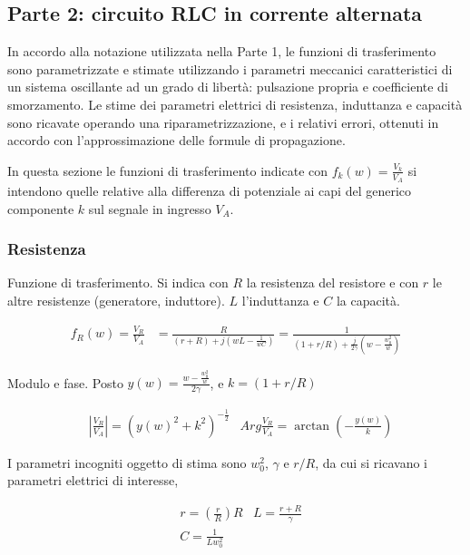 \subsection{Parte 2: circuito RLC in corrente alternata}

In accordo alla notazione utilizzata nella Parte 1, le funzioni di trasferimento sono parametrizzate e stimate utilizzando i parametri meccanici caratteristici di un sistema oscillante ad un grado di libertà: pulsazione propria e coefficiente di smorzamento. Le stime dei parametri elettrici di resistenza, induttanza e capacità sono ricavate operando una riparametrizzazione, e i relativi errori, ottenuti in accordo con l'approssimazione delle formule di propagazione.

In questa sezione le funzioni di trasferimento indicate con 
$f_{k}(w) = \frac{V_k}{V_A}$ si intendono quelle relative alla differenza di potenziale ai capi del generico componente $k$ sul segnale in ingresso $V_A$.





\subsubsection{Resistenza}

Funzione di trasferimento.
Si indica con $R$ la resistenza del resistore e con $r$ le altre resistenze (generatore, induttore).
$L$ l'induttanza e $C$ la capacità.

\begin{align*}
f_{R}(w) = \frac{V_{R}}{V_{A}} &= \frac{R}{(r+R) + j(wL - \frac{1}{wC})} 
= \frac{1}{(1+r/R) + \frac{j}{2\gamma}(w - \frac{w_0^2}{w})}
\end{align*}

Modulo e fase.
Posto $ y(w) = \frac{w - \frac{w_0^2}{w}}{2\gamma} $, e 
$ k = (1+r/R)$

\begin{align*}
& |\frac{V_{R}}{V_{A}}|  = ( y(w)^2 + k^2)^{-\frac{1}{2}}
& Arg\frac{V_{R}}{V_{A}} = \arctan( - \frac{y(w)}{k} )
\end{align*}

I parametri incogniti oggetto di stima sono
$ w_0^2 $, $\gamma$ e $r/R$, da cui si ricavano i parametri elettrici di interesse,

\begin{align*}
    & r = (\frac{ r }{R}) R
    & L =  \frac{r+R}{\gamma}\\
    & C = \frac{1}{L w_{0}^{2}}
\end{align*}

